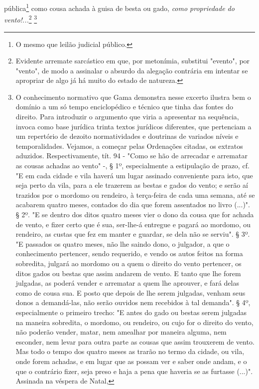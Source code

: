 pública\footnote{O mesmo que leilão judicial público.} como cousa
achada à guisa de besta ou gado, \emph{como propriedade do
vento!...}\footnote{Evidente arremate sarcástico em que, por
  metonímia, substitui "evento", por "vento", de modo a assinalar o
  absurdo da alegação contrária em intentar se apropriar de algo já há
  muito do estado de natureza.} \footnote{O conhecimento normativo que
  Gama demonstra nesse excerto ilustra bem o domínio a um só tempo
  enciclopédico e técnico que tinha das fontes do direito. Para
  introduzir o argumento que viria a apresentar na sequência, invoca
  como base jurídica trinta textos jurídicos diferentes, que pertenciam
  a um repertório de dezoito normatividades e doutrinas de variados
  níveis e temporalidades. Vejamos, a começar pelas Ordenações citadas,
  os extratos aduzidos. Respectivamente, tít. 94 - "Como se hão de
  arrecadar e arrematar as cousas achadas ao vento" -, § 1º,
  especialmente a estipulação de prazo, cf. "E em cada cidade e vila
  haverá um lugar assinado conveniente para isto, que seja perto da
  vila, para a ele trazerem as bestas e gados do vento; e serão aí
  trazidos por o mordomo ou rendeiro, à terça-feira de cada uma semana,
  até se acabarem quatro meses, contados do dia que forem assentados no
  livro (...)". § 2º. "E se dentro dos ditos quatro meses vier o dono da
  cousa que for achada de vento, e fizer certo que é sua, ser-lhe-á
  entregue e pagará ao mordomo, ou rendeiro, as custas que fez em manter
  e guardar, se dela não se serviu". § 3º. "E passados os quatro meses,
  não lhe saindo dono, o julgador, a que o conhecimento pertencer, sendo
  requerido, e vendo os autos feitos na forma sobredita, julgará ao
  mordomo ou a quem o direito do vento pertencer, os ditos gados ou
  bestas que assim andarem de vento. E tanto que lhe forem julgadas, as
  poderá vender e arrematar a quem lhe aprouver, e fará delas como de
  cousa sua. E posto que depois de lhe serem julgadas, venham seus donos
  a demandá-las, não serão ouvidos nem recebidos à tal demanda". § 4º,
  especialmente o primeiro trecho: "E antes do gado ou bestas serem
  julgadas na maneira sobredita, o mordomo, ou rendeiro, ou cujo for o
  direito do vento, não poderão vender, matar, nem amealhar por maneira
  alguma, nem esconder, nem levar para outra parte as cousas que assim
  trouxerem de vento. Mas todo o tempo dos quatro meses as trarão no
  termo da cidade, ou vila, onde forem achadas, e em lugar que as possam
  ver e saber onde andam, e o que o contrário fizer, seja preso e haja a
  pena que haveria se as furtasse (...)". Assinada na véspera de Natal,
}
